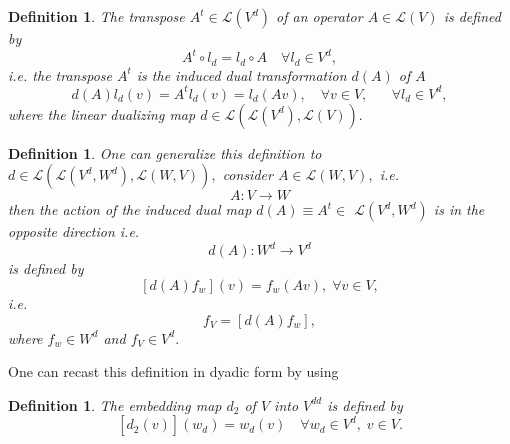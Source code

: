 \documentclass[aps,preprint]{revtex4}
\newtheorem{definition}[theorem]{Definition}
\begin{document}
\begin{definition}
The transpose $A^{t}\in \mathcal{L}\left( V^{d}\right) $ of an operator $%
A\in \mathcal{L}\left( V\right) $ is defined by%
\begin{equation}
A^{t}\circ l_{d}=l_{d}\circ A\quad \forall l_{d}\in V^{d},
\end{equation}%
i.e. the transpose $A^{t}$ is the induced \emph{dual transformation} $%
d\left( A\right) $ of $A$ 
\begin{equation}
d\left( A\right) l_{d}\left( v\right) =A^{t}l_{d}\left( v\right)
=l_{d}\left( Av\right) ,\quad \forall v\in V,\quad \text{ }\forall l_{d}\in
V^{d},
\end{equation}%
where the linear dualizing map $d\in \mathcal{L}\left( \overset{}{\mathcal{L}%
\left( V^{d}\right) ,\mathcal{L}\left( V\right) }\right) .$
\end{definition}

\begin{definition}
\label{General Transpose Definition} One can generalize this definition to $%
d\in \mathcal{L}\left( \overset{}{\mathcal{L}\left( V^{d},W^{d}\right) ,%
\mathcal{L}\left( W,V\right) }\right) ,$ consider $A\in \mathcal{L}\left(
W,V\right) ,$ i.e. 
\begin{equation}
A:V\rightarrow W
\end{equation}%
then the action of the induced dual map $d\left( A\right) \equiv A^{t}\in $ $%
\mathcal{L}\left( V^{d},W^{d}\right) $ is in the opposite direction i.e. 
\begin{equation}
d\left( A\right) :W^{d}\rightarrow V^{d}
\end{equation}%
is defined by 
\begin{equation}
\left[ d\left( A\right) f_{w}\right] \left( v\right) =f_{w}\left( Av\right)
,\;\forall v\in V,
\end{equation}%
i.e. 
\begin{equation}
f_{V}=\left[ d\left( A\right) f_{w}\right] ,
\end{equation}%
where $f_{w}\in W^{d}$ and $f_{V}\in V^{d}.$
\end{definition}

One can recast this definition in dyadic form by using

\begin{definition}
The embedding map $d_{2}$ of $V$ into $V^{dd}$ is defined by 
\begin{equation}
\left[ \overset{}{d_{2}\left( v\right) }\right] \left( w_{d}\right)
=w_{d}\left( v\right) \quad \forall w_{d}\in V^{d},\;v\in V.
\end{equation}
\end{definition}
\end{document}
